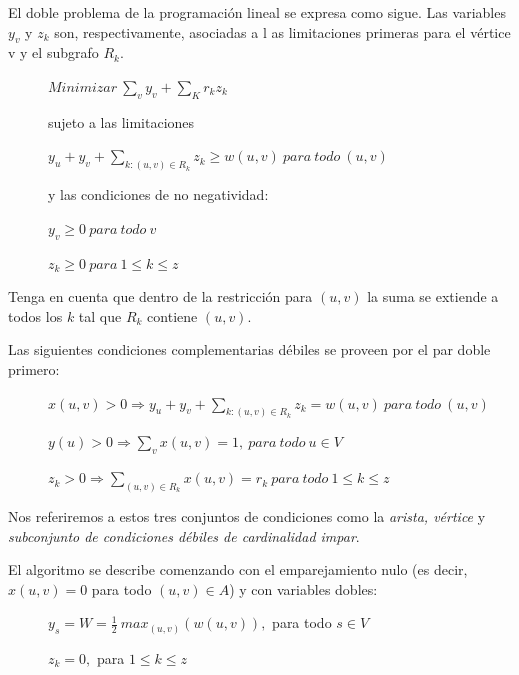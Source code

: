 \documentclass[10pt,a5paper]{book}
\begin{document}
El doble problema de la programación lineal se expresa como sigue. Las variables $y_v$ y $z_k$ son, respectivamente, asociadas a l
as limitaciones primeras para el vértice v y el subgrafo $R_k$.\\

\begin{description}
\item[] \quad $ Minimizar\ \sum_v y_v + \sum_K r_kz_k$
\item[] \quad sujeto a las limitaciones
\item[] \quad $ y_u + y_v + \sum_{k:(u,v)\in R_k} z_k \ge w(u,v)\ para\ todo\ (u,v)$
\item[] \quad y las condiciones de no negatividad: 
\item[] \quad $y_v \ge 0\ para\ todo\ v$
\item[] \quad $z_k \ge 0\ para\ 1 \le k \le z$
\end{description}

Tenga en cuenta que dentro de la restricción para $(u,v)$ la suma se extiende a todos los $k$ tal que $R_k$ contiene $(u,v)$.

Las siguientes condiciones complementarias débiles se proveen por el par doble primero:\\

\begin{description}
\item[] \quad $ x(u,v) > 0 \Rightarrow y_u + y_v + \sum_{k:(u,v)\in R_k} z_k = w(u,v)\ para\ todo\ (u,v)$
\item[] \quad $ y(u) > 0 \Rightarrow \sum_v x(u,v) = 1,\ para\ todo\ u \in V$
\item[] \quad $z_k > 0 \Rightarrow \sum_{(u,v) \in R_k} x(u,v) = r_k\ para\ todo\ 1 \le k \le z$
\end{description}

Nos referiremos a estos tres conjuntos de condiciones como la \emph{arista, vértice} y \emph{subconjunto de condiciones débiles de cardinalidad impar}.

El algoritmo se describe comenzando con el emparejamiento nulo (es decir, $x(u,v) = 0$ para todo $(u,v) \in A$) y con variables dobles:

\begin{description}
\item[] \quad $y_s = W = \frac{1}{2}\ max_{(u,v)} (w(u,v)),$ para todo $s \in V$
\item[] \quad $z_k = 0,$ para $1 \le k \le z$
\end{description}
\end{document}
